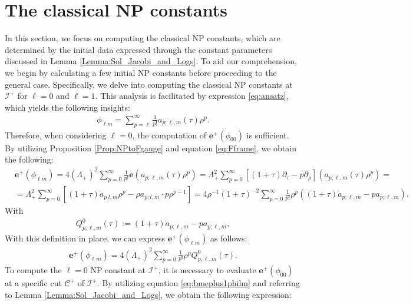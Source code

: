 \section{The classical NP constants}
\label{sec:classicalNP}

In this section, we focus on computing the classical NP constants, which are determined by the initial data expressed through the constant parameters discussed in Lemma \ref{Lemma:Sol_Jacobi_and_Logs}. To aid our comprehension, we begin by calculating a few initial NP constants before proceeding to the general case. Specifically, we delve into computing the classical NP constants at $\mathscr{I}^{+}$ for $\ell=0$ and $\ell=1$. This analysis is facilitated by expression \eqref{eq:ansatz}, which yields the following insights:
\begin{align}\label{eq:exp_phi_lm}
  \phi_{\ell m}= \sum_{p=\ell}^{\infty}\frac{1}{p!}a_{p;\ell,m}(\tau)\rho^{p}.
\end{align}
Therefore, when considering $\ell=0$, the computation of $\boldsymbol{e}^{+}(\phi_{00})$ is sufficient. By utilizing Proposition \ref{Prop:NPtoFgauge} and equation \eqref{eq:Fframe}, we obtain the following:
\begin{align}\label{eq:bmeplus1philmraw}
   & \boldsymbol{e}^{+}(\phi_{\ell m})= 4(\Lambda_{+})^{2}\sum_{p=0}^{\infty}\frac{1}{p!}\boldsymbol{e}(a_{p;\ell,m}(\tau)\rho^{p}) = \Lambda_{+}^{2} \sum_{p=0}^{\infty} \left[(1+\tau) \partial_{\tau}-p \partial_{\rho}\right]\left(a_{p ; \ell, m}(\tau) \rho^{p}\right)= \nonumber \\
   & =\Lambda_{+}^{2} \sum_{p=0}^{\infty} \left[(1+\tau) \dot{a}_{p_; l, m} \rho^{p}-\rho a_{p ; l, m} \cdot p \rho^{p-1}\right] = 4 \rho^{-1}(1+\tau)^{-2}\sum_{p=0}^{\infty} \frac{1}{p!}\rho^p((1+\tau)\dot{a}_{p;\ell,m}-p a_{p;\ell,m}).
\end{align}
With
\begin{align}\label{eq:defQ0}
  Q^{0}_{p;\ell,m}(\tau):=(1+\tau)\dot{a}_{p;\ell,m}-p a_{p;\ell,m},
\end{align}
With this definition in place, we can express $\boldsymbol{e}^{+}(\phi_{\ell m})$ as follows:
\begin{align}\label{eq:bmeplus1philm}
  \boldsymbol{e}^{+}(\phi_{\ell m}) = 4 (\Lambda_{+})^{2}\sum_{p=0}^{\infty} \frac{1}{p!}\rho^{p}Q^{0}_{p,\ell,m}(\tau).
\end{align}
To compute the $\ell=0$ NP constant at $\mathscr{I}^{+}$, it is necessary to evaluate $\boldsymbol{e}^{+}(\phi_{00})$ at a specific cut $\mathcal{C}^{+}$ of $\mathscr{I}^{+}$. By utilizing equation \eqref{eq:bmeplus1philm} and referring to Lemma \ref{Lemma:Sol_Jacobi_and_Logs}, we obtain the following expression:
